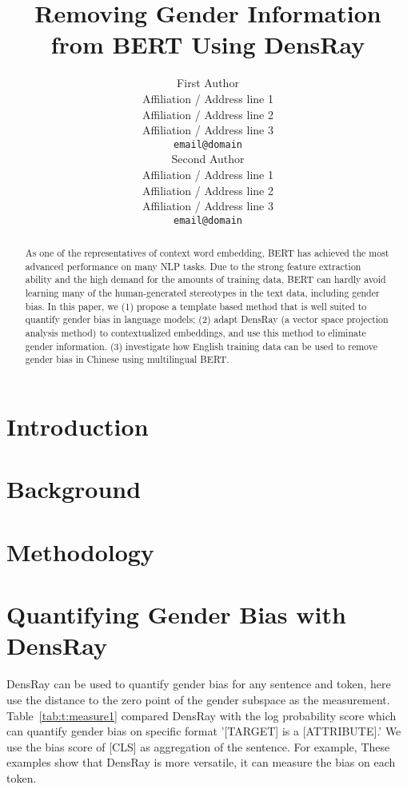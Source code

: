 \documentclass[11pt,a4paper]{article}
\title{Removing Gender Information from BERT Using DensRay}
\author{First Author \\
  Affiliation / Address line 1 \\
  Affiliation / Address line 2 \\
  Affiliation / Address line 3 \\
  \texttt{email@domain} \\\And
  Second Author \\
  Affiliation / Address line 1 \\
  Affiliation / Address line 2 \\
  Affiliation / Address line 3 \\
  \texttt{email@domain} \\}
\date{}
\def\tabref#1{Table~\ref{tab:#1}}
\begin{document}
\maketitle

\begin{abstract}
As one of the representatives of context word embedding, BERT has achieved the most advanced performance on many NLP tasks. Due to the strong feature extraction ability and the high demand for the amounts of training data, BERT can hardly avoid learning many of the human-generated stereotypes in the text data, including gender bias. In this paper, we (1) propose a template based method that is well suited to quantify gender bias in language models; (2) adapt DensRay (a vector space projection analysis method) to contextualized embeddings, and use this method to eliminate gender information. (3) investigate how English training data can be used to remove gender bias in Chinese using multilingual BERT.
\end{abstract}

\section{Introduction}


\section{Background}


\section{Methodology}


\section{Quantifying Gender Bias with DensRay}
DensRay can be used to quantify gender bias for any sentence and token, here use the distance to the zero point of the gender subspace as the measurement. \tabref{t:measure1} compared DensRay with the log probability score \citep{kurita2019measuring} which can quantify gender bias on specific format '[TARGET] is a [ATTRIBUTE].' We use the bias score of [CLS] as aggregation of the sentence. For example, These examples show that DensRay is more versatile, it can measure the bias on each token.
\end{document}
